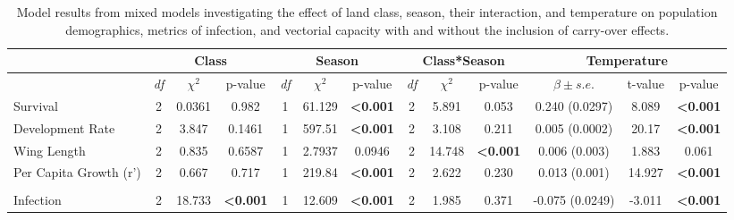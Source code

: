 \documentclass[12pt]{article}
\begin{document}
\begin{landscape}
\begin{table}[]
\centering
\caption{Model results from mixed models investigating the effect of land class, season, their interaction, and temperature on population demographics, metrics of infection, and vectorial capacity with and without the inclusion of carry-over effects.}
\label{table:modelResults}
\begin{tabular}{l|ccc|ccc|ccc|ccc}
                                  & \multicolumn{3}{c}{\textbf{Class}}             & \multicolumn{3}{c}{\textbf{Season}}            & \multicolumn{3}{c}{\textbf{Class*Season}}      & \multicolumn{3}{c}{\textbf{Temperature}}             \\
\hline
                                  & \textit{df} & $\chi^2$  & p-value                 & \textit{df} & $\chi^2$  & p-value                 & \textit{df} & $\chi^2$  & p-value                 & $\beta \pm s.e.$          & t-value & p-value                 \\
\hline
Survival                    & 2           & 0.0361    & 0.982                   & 1           & 61.129    & \textbf{\textless0.001} & 2           & 5.891     & 0.053                   & 0.240 (0.0297)   & 8.089   & \textbf{\textless0.001} \\
Development Rate            & 2           & 3.847     & 0.1461                  & 1           & 597.51    & \textbf{\textless0.001} & 2           & 3.108     & 0.211                   & 0.005 (0.0002)   & 20.17   & \textbf{\textless0.001} \\
Wing Length                 & 2           & 0.835     & 0.6587                  & 1           & 2.7937    & 0.0946                  & 2           & 14.748    & \textbf{\textless0.001} & 0.006 (0.003)    & 1.883   & 0.061                   \\
Per Capita Growth (r')      & 2           & 0.667     & 0.717                   & 1           & 219.84    & \textbf{\textless0.001} & 2           & 2.622     & 0.230                   & 0.013 (0.001)    & 14.927  & \textbf{\textless0.001}  \\
                            &             &           &                         &             &           &                         &             &           &                         &                  &         &                         \\
Infection                   & 2           & 18.733    & \textbf{\textless0.001} & 1           & 12.609    & \textbf{\textless0.001} & 2           & 1.985     & 0.371                   & -0.075 (0.0249)  & -3.011  & \textbf{\textless0.001} \\

\end{tabular}
\end{table}
\end{landscape}
\end{document}
